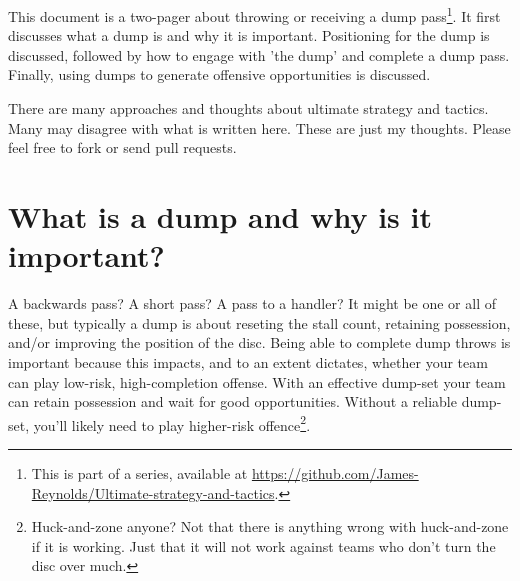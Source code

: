 \documentclass{tufte-handout}
\begin{document}
This document is  
a two-pager about 
throwing or 
receiving a dump pass\footnote{
This
is part of a series, 
available at
\url{https://github.com/James-Reynolds/Ultimate-strategy-and-tactics}.}. 
It first discusses 
what a dump is 
and why it is important. 
Positioning for the dump 
is discussed, 
followed by how to 
engage with 'the dump'
and complete a dump pass. 
Finally, using 
dumps to generate 
offensive opportunities 
is discussed. 

There are 
many approaches 
and thoughts 
about ultimate 
strategy 
and tactics. 
Many
may disagree 
with what is 
written here. 
These are just 
my thoughts. 
Please feel free to 
fork or send pull requests.

\section{What is a dump and why is it important?}\label{sec:what_is_a_dump}
A backwards pass?  
A short pass?  
A pass 
to a handler?
It might be 
one 
or all 
of these, 
but typically 
a dump is about 
reseting the stall count, 
retaining possession, 
and/or improving the position
of the disc.  
Being able 
to complete 
dump throws 
is important because 
this impacts, 
and to an extent dictates, 
whether your team can 
play low-risk, high-completion 
offense. 
With an effective dump-set 
your team can retain possession
and wait for  
good opportunities.  
Without a reliable dump-set, 
you'll likely 
need to play higher-risk 
offence\footnote{
Huck-and-zone anyone? 
Not that there is anything 
wrong with huck-and-zone 
if it is working. 
Just that it 
will not 
work against teams
who don't turn the disc over much.}.  
\end{document}
